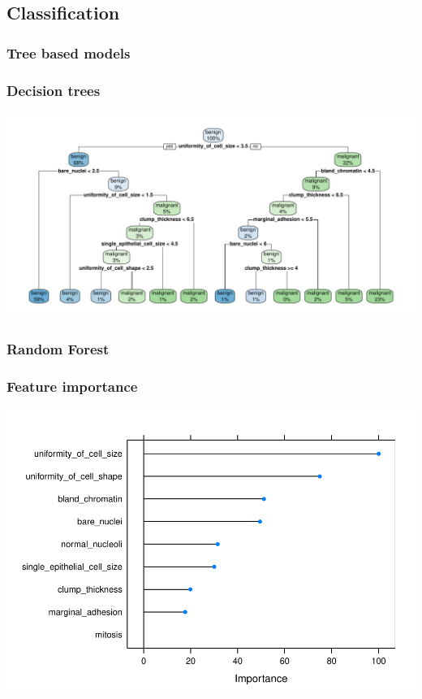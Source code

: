 \documentclass[handout, t, 11pt, xcolor=svgnames, hyperref={colorlinks,citecolor=DeepPink4,linkcolor=DarkRed,urlcolor=DarkBlue}]{beamer} %
\begin{document}
\subsection{Classification}

\subsubsection{Tree based models}

\begin{frame}
	\frametitle{Decision trees}
	
	\begin{center}\includegraphics[width=1\textwidth]{webinar_code_files/figure-latex/unnamed-chunk-12-1} \end{center}
	
\end{frame}

\begin{frame}
	\frametitle{Random Forest}
	
	
\end{frame}

\begin{frame}
	\frametitle{Feature importance}
	
	\begin{center}\includegraphics[width=1\textwidth]{webinar_code_files/figure-latex/unnamed-chunk-11-1.pdf} \end{center}
\end{frame}
\end{document}
